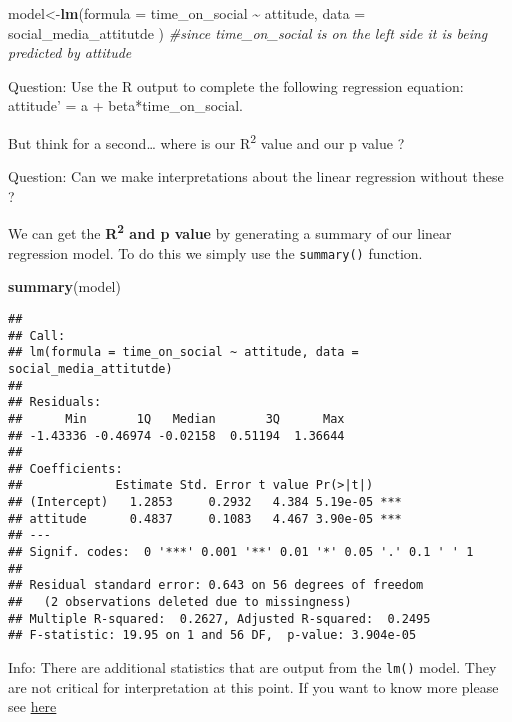 \documentclass[
]{book}
\newenvironment{Shaded}{\begin{snugshade}}{\end{snugshade}}
\newcommand{\AttributeTok}[1]{\textcolor[rgb]{0.13,0.29,0.53}{#1}}
\newcommand{\CommentTok}[1]{\textcolor[rgb]{0.56,0.35,0.01}{\textit{#1}}}
\newcommand{\FunctionTok}[1]{\textcolor[rgb]{0.13,0.29,0.53}{\textbf{#1}}}
\newcommand{\NormalTok}[1]{#1}
\newcommand{\OtherTok}[1]{\textcolor[rgb]{0.56,0.35,0.01}{#1}}
\newcommand{\SpecialCharTok}[1]{\textcolor[rgb]{0.81,0.36,0.00}{\textbf{#1}}}
\begin{document}
\begin{Shaded}
\begin{Highlighting}[]
\NormalTok{model}\OtherTok{\textless{}{-}}\FunctionTok{lm}\NormalTok{(}\AttributeTok{formula =}\NormalTok{ time\_on\_social }\SpecialCharTok{\textasciitilde{}}\NormalTok{ attitude, }\AttributeTok{data =}\NormalTok{ social\_media\_attitutde ) }\CommentTok{\#since time\_on\_social is on the left side it is being predicted by attitude }
\end{Highlighting}
\end{Shaded}

Question: Use the R output to complete the following regression equation:
attitude' = a + beta*time\_on\_social.

But think for a second\ldots{} where is our R\textsuperscript{2} value and our p value ?

Question: Can we make interpretations about the linear regression without these ?

We can get the \textbf{R\textsuperscript{2} and p value} by generating a summary of our linear regression model. To do this we simply use the \texttt{summary()} function.

\begin{Shaded}
\begin{Highlighting}[]
\FunctionTok{summary}\NormalTok{(model)}
\end{Highlighting}
\end{Shaded}

\begin{verbatim}
## 
## Call:
## lm(formula = time_on_social ~ attitude, data = social_media_attitutde)
## 
## Residuals:
##      Min       1Q   Median       3Q      Max 
## -1.43336 -0.46974 -0.02158  0.51194  1.36644 
## 
## Coefficients:
##             Estimate Std. Error t value Pr(>|t|)    
## (Intercept)   1.2853     0.2932   4.384 5.19e-05 ***
## attitude      0.4837     0.1083   4.467 3.90e-05 ***
## ---
## Signif. codes:  0 '***' 0.001 '**' 0.01 '*' 0.05 '.' 0.1 ' ' 1
## 
## Residual standard error: 0.643 on 56 degrees of freedom
##   (2 observations deleted due to missingness)
## Multiple R-squared:  0.2627, Adjusted R-squared:  0.2495 
## F-statistic: 19.95 on 1 and 56 DF,  p-value: 3.904e-05
\end{verbatim}

Info: There are additional statistics that are output from the \texttt{lm()} model. They are not critical for interpretation at this point. If you want to know more please see \href{https://feliperego.github.io/blog/2015/10/23/Interpreting-Model-Output-In-R}{here}
\end{document}

